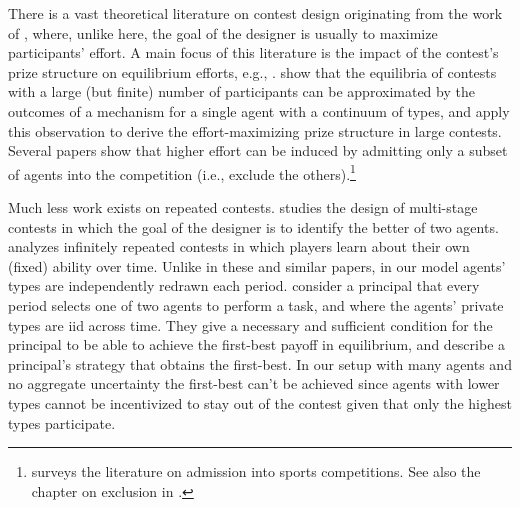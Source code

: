 \documentclass[12pt]{article}
\theoremstyle{plain}
\theoremstyle{definition}
\theoremstyle{remark}
\begin{document}
There is a vast theoretical literature on contest design originating from the work of \citet{lazear1981rank}, where, unlike here, the goal of the designer is usually to maximize participants' effort. A main focus of this literature is the impact of the contest's prize structure on equilibrium efforts, e.g., \citet{moldovanu2001optimal, moldovanu2006contest}. \citet{olszewski2016large} show that the equilibria of contests with a large (but finite) number of participants can be approximated by the outcomes of a mechanism for a single agent with a continuum of types, and \citet{olszewski2020performance} apply this observation to derive the effort-maximizing prize structure in large contests. Several papers \citep{baye1993rigging, fullerton1999auctionin} show that higher effort can be induced by admitting only a subset of agents into the competition (i.e., exclude the others).\footnote{\citet{szymanski2003economic} surveys the literature on admission into sports competitions. See also the chapter on exclusion in \citet{konrad2009strategy}.} 

Much less work exists on repeated contests. \citet{meyer1991learning} studies the design of multi-stage contests in which the goal of the designer is to identify the better of two agents. \citet{krahmer2007equilibrium} analyzes infinitely repeated contests in which players learn about their own (fixed) ability over time. Unlike in these and similar papers, in our model agents' types are independently redrawn each period. \citet{de2021selecting} consider a principal that every period selects one of two agents to perform a task, and where the agents' private types are iid across time. They give a necessary and sufficient condition for the principal to be able to achieve the first-best payoff in equilibrium, and describe a principal's strategy that obtains the first-best. In our setup with many agents and no aggregate uncertainty the first-best can't be achieved since agents with lower types cannot be incentivized to stay out of the contest given that only the highest types participate.


\end{document}
